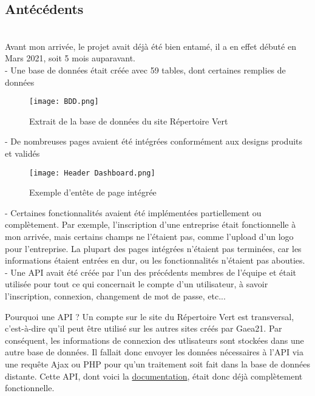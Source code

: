 \pagebreak
\subsection{Antécédents}
~\\
Avant mon arrivée, le projet avait déjà été bien entamé, il a en effet débuté en Mars 2021, soit 5 mois auparavant. \\
- Une base de données était créée avec 59 tables, dont certaines remplies de données \\

\begin{figure}[H]
    \centering
    \texttt{[image: BDD.png]}
    \caption{Extrait de la base de données du site Répertoire Vert}
\end{figure}

- De nombreuses pages avaient été intégrées conformément aux designs produits et validés \\

\begin{figure}[H]
    \centering
    \texttt{[image: Header Dashboard.png]}
    \caption{Exemple d'entête de page intégrée}
\end{figure}

- Certaines fonctionnalités avaient été implémentées partiellement ou complètement. Par exemple, l'inscription d'une entreprise était fonctionnelle à mon arrivée, mais certains champs ne l'étaient pas, comme l'upload d'un logo pour l'entreprise.
La plupart des pages intégrées n'étaient pas terminées, car les informations étaient entrées en dur, ou les fonctionnalités n'étaient pas abouties. \\

- Une API avait été créée par l'un des précédents membres de l'équipe et était utilisée pour tout ce qui concernait le compte d'un utilisateur, à savoir l'inscription, connexion, changement de mot de passe, etc... \\

\begin{callout}{Pourquoi une API ?}
Un compte sur le site du Répertoire Vert est transversal, c'est-à-dire qu'il peut être utilisé sur les autres sites créés par Gaea21. 
Par conséquent, les informations de connexion des utlisateurs sont stockées dans une autre base de données. 
Il fallait donc envoyer les données nécessaires à l'API via une requête Ajax ou PHP pour qu'un traitement soit fait dans la base de données distante. 
Cette API, dont voici la \href{https://gaea21user.sustlivprogram.org/swagger/#/}{documentation}, était donc déjà complètement fonctionnelle.
\end{callout}

